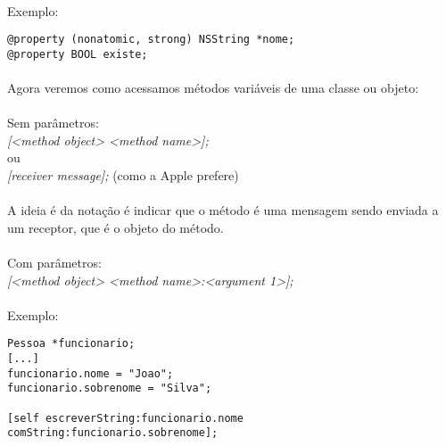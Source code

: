 \documentclass[a4paper,12pt,brazil,doubleside]{book}
\begin{document}
\paragraph{}Exemplo:

\begin{lstlisting}
@property (nonatomic, strong) NSString *nome;
@property BOOL existe;
\end{lstlisting}

\bigskip
\bigskip

\paragraph{}Agora veremos como acessamos métodos variáveis de uma classe ou objeto:\\

\paragraph{}Sem parâmetros:\\
\emph{[<method object> <method name>];}\\
ou\\
\emph{[receiver message];} (como a Apple prefere)\\


\paragraph{}A ideia é da notação é indicar que o método é uma mensagem sendo enviada a um receptor, que é o objeto do método.\\

\paragraph{}Com parâmetros:\\
\emph{[<method object> <method name>:<argument 1>];}\\

\paragraph{}Exemplo:

\begin{lstlisting}
Pessoa *funcionario;
[...]
funcionario.nome = "Joao";
funcionario.sobrenome = "Silva";

[self escreverString:funcionario.nome comString:funcionario.sobrenome];
\end{lstlisting}
\end{document}
